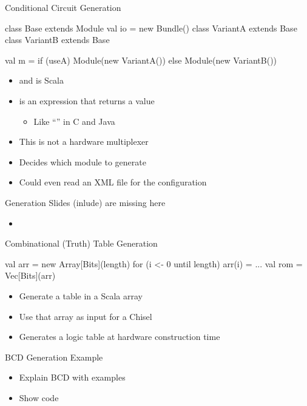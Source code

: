 \begin{frame}[fragile]{Conditional Circuit Generation}
\begin{chisel}
class Base extends Module { val io = new Bundle() }
class VariantA extends Base { }
class VariantB extends Base { }

val m = if (useA) Module(new VariantA())
        else Module(new VariantB())
\end{chisel}
\begin{itemize}
\item {} and  is Scala
\item {} is an expression that returns a value
\begin{itemize}
\item Like ``'' in C and Java
\end{itemize}
\item This is not a hardware multiplexer
\item Decides which module to generate
\item Could even read an XML file for the configuration
\end{itemize}
\end{frame}

%

\begin{frame}[fragile]{Generation Slides (inlude) are missing here}
\begin{itemize}
\item 
\end{itemize}
\end{frame}

\begin{frame}[fragile]{Combinational (Truth) Table Generation}
\begin{chisel}
val arr = new Array[Bits](length)
for (i <- 0 until length) {
  arr(i) = ...
}
val rom = Vec[Bits](arr)
\end{chisel}
\begin{itemize}
\item Generate a table in a Scala array
\item Use that array as input for a Chisel 
\item Generates a logic table at hardware construction time
\end{itemize}
\end{frame}

\begin{frame}[fragile]{BCD Generation Example}
\begin{itemize}
\item Explain BCD with examples
\item Show code
\end{itemize}
\end{frame}


